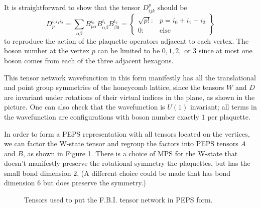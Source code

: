 It is straightforward to show that the tensor $D^p_{ijk}$ should be
$$
D_{p}^{i_0 i_1 i_2} = \sum\limits_{\alpha \beta} B^{i_0}_{p \alpha}B^{i_1}_{\alpha \beta} B^{i_2}_{\beta 0}  = \left\{ \begin{array}{lr}
													\sqrt{p!}  : & p =i_0+i_1+i_2  \\
													0  : & \text{else}
													\end{array}
											\right\}
$$
to reproduce the action of the plaquette operators adjacent to each vertex. The boson number at the vertex $p$ can be limited to be $0, 1, 2,$ or $3$ since at most one boson comes from each of the three adjacent hexagons.

This tensor network wavefunction in this form manifestly has all the translational and point group symmetries of the honeycomb lattice, since the tensors $W$ and $D$ are invariant under rotations of their virtual indices in the plane, as shown in the picture. One can also check that the wavefunction is $U(1)$ invariant; all terms in the wavefunction are configurations with boson number exactly $1$ per plaquette.

In order to form a PEPS representation with all tensors located on the vertices, we can factor the W-state tensor and regroup the factors into PEPS tensors $A$ and $B$, as shown in Figure \ref{fig:FBI_PEPS_2}. There is a choice of MPS for the W-state that doesn't manifestly preserve the rotational symmetry the plaquettes, but has the small bond dimension $2$. (A different choice could be made that has bond dimension 6 but does preserve the symmetry.) 

\begin{figure}[H]
	\centering
	\quad
		
%
\caption{Tensors used to put the F.B.I. tensor network in PEPS form. }
\label{fig:FBI_PEPS_2}
\end{figure}

